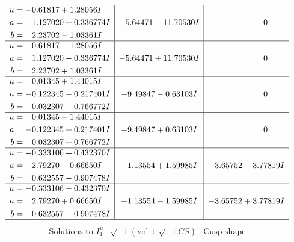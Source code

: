 \documentclass[1p]{elsarticle_modified}
\theoremstyle{definition}
\newcommand{\I}{\sqrt{-1}}
\begin{document}
$$\begin{array}{c|c|c}
\begin{aligned}
u &= -0.61817 + 1.28056 I \\
a &= \phantom{-}1.127020 + 0.336774 I \\
b &= \phantom{-}2.23702 - 1.03361 I\end{aligned}
 & -5.64471 - 11.70530 I & \phantom{-0.000000 } 0 \\ \hline\begin{aligned}
u &= -0.61817 - 1.28056 I \\
a &= \phantom{-}1.127020 - 0.336774 I \\
b &= \phantom{-}2.23702 + 1.03361 I\end{aligned}
 & -5.64471 + 11.70530 I & \phantom{-0.000000 } 0 \\ \hline\begin{aligned}
u &= \phantom{-}0.01345 + 1.44015 I \\
a &= -0.122345 - 0.217401 I \\
b &= \phantom{-}0.032307 - 0.766772 I\end{aligned}
 & -9.49847 - 0.63103 I & \phantom{-0.000000 } 0 \\ \hline\begin{aligned}
u &= \phantom{-}0.01345 - 1.44015 I \\
a &= -0.122345 + 0.217401 I \\
b &= \phantom{-}0.032307 + 0.766772 I\end{aligned}
 & -9.49847 + 0.63103 I & \phantom{-0.000000 } 0 \\ \hline\begin{aligned}
u &= -0.333106 + 0.432370 I \\
a &= \phantom{-}2.79270 - 0.66650 I \\
b &= \phantom{-}0.632557 - 0.907478 I\end{aligned}
 & -1.13554 + 1.59985 I & -3.65752 - 3.77819 I \\ \hline\begin{aligned}
u &= -0.333106 - 0.432370 I \\
a &= \phantom{-}2.79270 + 0.66650 I \\
b &= \phantom{-}0.632557 + 0.907478 I\end{aligned}
 & -1.13554 - 1.59985 I & -3.65752 + 3.77819 I\\
 \hline 
 \end{array}$$\newpage$$\begin{array}{c|c|c}  
\text{Solutions to }I^u_{1}& \I (\text{vol} + \sqrt{-1}CS) & \text{Cusp shape}\\
 \hline 
\begin{aligned}

\end{aligned}
\end{array}$$
\end{document}
